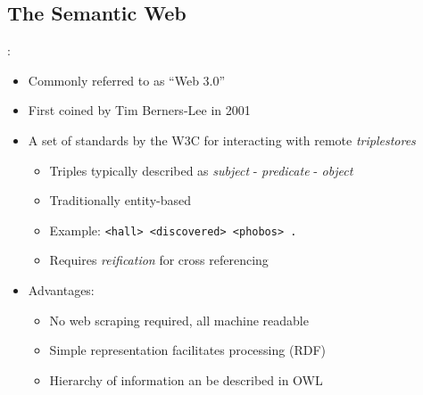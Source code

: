 \documentclass[logoontitle,tabu,supertabular,aspectratio=43]{preney-uwindsor-beamer}
\begin{document}
    \subsection{The Semantic Web}
    \begin{frame}{\insertsection: \insertsubsection}
        \begin{itemize}
            \item Commonly referred to as ``Web 3.0''
            \item First coined by Tim Berners-Lee in 2001 \cite{berners2001semantic}
            \item A set of standards by the W3C for interacting with remote {\em triplestores} \cite{w3csemanticweb}
            \begin{itemize}
                \item Triples typically described as {\em subject} - {\em predicate} - {\em object}
                \item Traditionally entity-based
                \item Example: \texttt{<hall> <discovered> <phobos> .}
                \item Requires {\em reification} for cross referencing
            \end{itemize}
            \item Advantages:
            \begin{itemize}
                \item No web scraping required, all machine readable
                \item Simple representation facilitates processing (RDF) \cite{w3c}
                \item Hierarchy of information an be described in OWL \cite{mcguinness2004owl}
            \end{itemize}
        \end{itemize}
    \end{frame}

\end{document}
